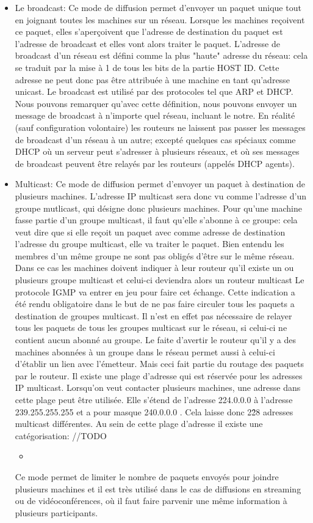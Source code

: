 \begin{itemize}
\item Le broadcast: Ce mode de diffusion permet d'envoyer un paquet unique tout en 
joignant toutes les machines sur un réseau. Lorsque les machines reçoivent ce
paquet, elles s'aperçoivent que l'adresse de destination du paquet est l'adresse de
broadcast et elles vont alors traiter le paquet. L'adresse de broadcast d'un réseau
est défini comme la plus "haute" adresse du réseau: cela se traduit par la mise
à 1 de tous les bits de la partie HOST ID. Cette adresse ne peut donc pas être
attribuée à une machine en tant qu'adresse unicast.  Le broadcast est utilisé
par des protocoles tel que ARP et DHCP.  Nous pouvons remarquer qu'avec cette
définition, nous pouvons envoyer un message de broadcast à n'importe quel
réseau, incluant le notre. En réalité (sauf
configuration volontaire) les routeurs ne laissent pas passer les messages de
broadcast d'un réseau à un autre; excepté quelques cas spéciaux comme DHCP où un
serveur peut s'adresser à plusieurs réseaux, et où ses messages de broadcast
peuvent être relayés par les routeurs (appelés DHCP agents).
\item Multicast: Ce mode de diffusion permet d'envoyer un paquet à destination
de plusieurs machines. L'adresse IP multicast sera donc vu comme l'adresse d'un groupe
mutlicast, qui désigne donc plusieurs machines. Pour qu'une machine fasse partie d'un
groupe multicast, il faut qu'elle s'abonne à ce groupe: cela veut dire que si elle reçoit
un paquet avec comme adresse de destination l'adresse du groupe multicast, elle va traiter
le paquet.
Bien entendu les membres d'un même groupe ne sont pas obligés d'être sur le même réseau. Dans ce
cas les machines doivent indiquer à leur routeur qu'il existe un ou plusieurs groupe multicast et celui-ci deviendra alors un routeur multicast 
 Le protocole IGMP va entrer en jeu pour faire cet échange.
Cette indication a été rendu obligatoire dans le but de ne pas faire circuler tous les paquets a destination de groupes multicast.
 Il n'est en effet pas nécessaire de relayer tous les paquets de tous les groupes
multicast sur le réseau, si celui-ci ne contient aucun abonné au groupe.
Le faite d'avertir le routeur qu'il y a des machines abonnées à un groupe dans le réseau permet aussi à celui-ci
d'établir un lien avec l'émetteur. Mais ceci fait partie du routage des paquets par le routeur.
Il existe une plage d'adresse qui est réservée pour les adresses IP multicast. Lorsqu'on veut contacter
plusieurs machines, une adresse dans cette plage peut être utilisée.
Elle s'étend de l'adresse 224.0.0.0 à l'adresse 239.255.255.255 et a pour masque 240.0.0.0 . Cela laisse donc 2\^28 adresses
multicast différentes.
Au sein de cette plage d'adresse il existe une catégorisation:
//TODO
\begin{itemize}
\item
\end{itemize}
Ce mode permet de limiter le nombre de paquets envoyés pour joindre plusieurs machines et il est très utilisé dans le cas
de diffusions en streaming ou de vidéoconférences, où il faut faire parvenir une même information à plusieurs participants.


\end{itemize}
